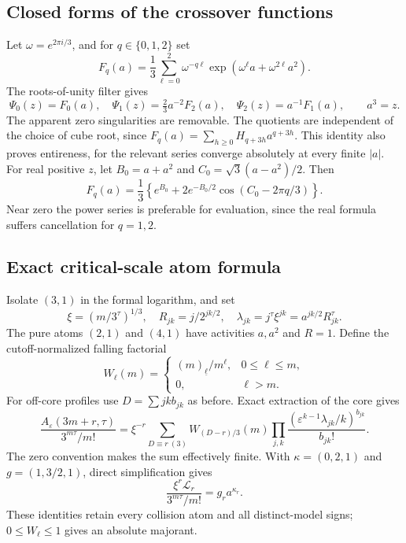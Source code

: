 \documentclass[11pt,letterpaper]{article}
\numberwithin{equation}{section}
\theoremstyle{definition}\newtheorem{definition}[theorem]{Definition}
\theoremstyle{remark}\newtheorem{remark}[theorem]{Remark}
\newcommand{\fall}[2]{(#1)_{\underline{#2}}}
\newcommand{\eps}{\varepsilon}
\begin{document}
\subsection{Closed forms of the crossover functions}
Let $\omega=e^{2\pi i/3}$, and for $q\in\{0,1,2\}$ set
\begin{equation}\label{det:dia:eq:rootsofunity}
 F_q(a)=\frac13\sum_{\ell=0}^2\omega^{-q\ell}
 \exp(\omega^\ell a+\omega^{2\ell}a^2).
\end{equation}
The roots-of-unity filter gives
\begin{equation}\label{det:dia:eq:Psifilter}
 \Psi_0(z)=F_0(a),\quad
 \Psi_1(z)=\tfrac23a^{-2}F_2(a),\quad
 \Psi_2(z)=a^{-1}F_1(a),\qquad a^3=z.
\end{equation}
The apparent zero singularities are removable. The quotients are
independent of the choice of cube root, since
$F_q(a)=\sum_{h\geq0}H_{q+3h}a^{q+3h}$. This identity also proves
entireness, for the relevant series converge absolutely at every finite
$|a|$. For real positive $z$, let $B_0=a+a^2$ and
$C_0=\sqrt3(a-a^2)/2$. Then
\begin{equation}\label{det:dia:eq:realfilter}
 F_q(a)=\frac13\left\{e^{B_0}+2e^{-B_0/2}
 \cos(C_0-2\pi q/3)\right\}.
\end{equation}
Near zero the power series is preferable for evaluation, since the real
formula suffers cancellation for $q=1,2$.

\subsection{Exact critical-scale atom formula}
Isolate $(3,1)$ in the formal logarithm, and set
\begin{equation}\label{det:dia:eq:activity}
 \xi=(m/3^\tau)^{1/3},\quad R_{jk}=j/2^{jk/2},\quad
 \lambda_{jk}=j^\tau\xi^{jk}=a^{jk/2}R_{jk}^{\tau}.
\end{equation}
The pure atoms $(2,1)$ and $(4,1)$ have activities $a,a^2$ and
$R=1$. Define the cutoff-normalized falling factorial
\[
 W_\ell(m)=\begin{cases}
 \fall{m}{\ell}/m^\ell,&0\leq\ell\leq m,\\
 0,&\ell>m.
 \end{cases}
\]
For off-core profiles use $D=\sum jk b_{jk}$ as before. Exact extraction
of the core gives
\begin{equation}\label{det:dia:eq:criticalatom}
 \frac{A_\eps(3m+r,\tau)}{3^{m\tau}/m!}
 =\xi^{-r}\sum_{D\equiv r\ (3)}W_{(D-r)/3}(m)
 \prod_{j,k}\frac{(\eps^{k-1}\lambda_{jk}/k)^{b_{jk}}}{b_{jk}!}.
\end{equation}
The zero convention makes the sum effectively finite. With
$\kappa=(0,2,1)$ and $g=(1,3/2,1)$, direct simplification gives
\begin{equation}\label{det:dia:eq:crossnormalization}
 \frac{\xi^r\mathcal L_r}{3^{m\tau}/m!}=g_r a^{\kappa_r}.
\end{equation}
These identities retain every collision atom and all distinct-model
signs; $0\leq W_\ell\leq1$ gives an absolute majorant.
\end{document}
